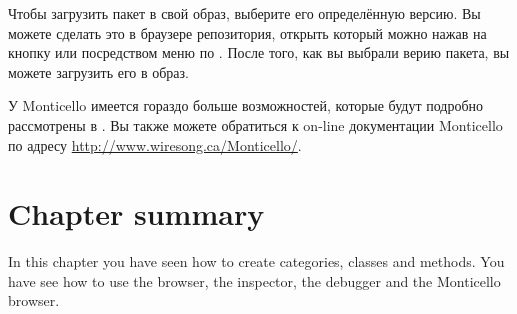 \documentclass[a4paper,10pt,twoside]{book}
\begin{document}
{%

Чтобы загрузить пакет в свой образ, выберите его определённую версию. Вы можете сделать это в браузере репозитория, открыть который можно нажав на кнопку  или посредством меню по \actclick. После того, как вы выбрали верию пакета, вы можете загрузить его в образ.


У Monticello имеется гораздо больше возможностей, которые будут подробно рассмотрены в .
Вы также можете обратиться к on-line документации Monticello по адресу \url{http://www.wiresong.ca/Monticello/}.

\section{Chapter summary}
In this chapter you have seen how to create categories, classes and methods.  You have see how to use the browser, the inspector, the debugger and the Monticello browser.

}
\end{document}
